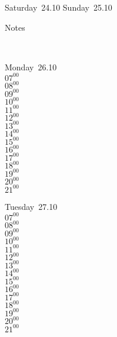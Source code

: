 \documentclass[11pt,a4paper]{book}\usepackage[]{graphicx}\usepackage[]{color}
\begin{document}
{{{{{{{{{{{{{{{{\begin{tcolorbox}[height=(\textheight-10mm)/6]
Saturday~24.10
\tcblower
Sunday~25.10
\end{tcolorbox} %
%
\begin{tcolorbox}[height=(\textheight-10mm)/6,sidebyside=false]
Notes
\end{tcolorbox}
\clearpage
\vspace{2 mm}\\
%
%
\begin{tcolorbox}
Monday~26.10\\
{ 
$07^{00}$\\
$08^{00}$\\
$09^{00}$\\
$10^{00}$\\
$11^{00}$\\
$12^{00}$\\
$13^{00}$\\
$14^{00}$\\
$15^{00}$\\
$16^{00}$\\
$17^{00}$\\
$18^{00}$\\
$19^{00}$\\
$20^{00}$\\
$21^{00}$}\\
\end{tcolorbox}
%
\begin{tcolorbox}
Tuesday~27.10\\
{ 
$07^{00}$\\
$08^{00}$\\
$09^{00}$\\
$10^{00}$\\
$11^{00}$\\
$12^{00}$\\
$13^{00}$\\
$14^{00}$\\
$15^{00}$\\
$16^{00}$\\
$17^{00}$\\
$18^{00}$\\
$19^{00}$\\
$20^{00}$\\
$21^{00}$}\\
\end{tcolorbox}
}}}}}}}}}}}}}}}}
\end{document}
